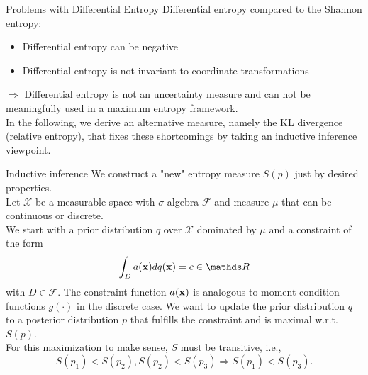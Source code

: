 \documentclass[11pt,compress,t,notes=noshow, xcolor=table]{beamer}
\begin{document}
    

\begin{vbframe} {Problems with Differential Entropy}
Differential entropy compared to the Shannon entropy:
\begin{itemize}
    \item Differential entropy can be negative
    \item Differential entropy is not invariant to coordinate transformations
\end{itemize}
$\Rightarrow$ Differential entropy is not an uncertainty measure and can not be meaningfully used in a maximum entropy framework. \\
\lz 
In the following, we derive an alternative measure, namely the KL divergence (relative entropy), that fixes these shortcomings by taking an inductive inference viewpoint.  
\end{vbframe}
\begin{vbframe}{Inductive inference}
    We construct a "new" entropy measure $S(p)$ just by desired properties.\\
    \lz
    Let $\mathcal{X}$ be a measurable space with $\sigma$-algebra $\mathcal{F}$ and measure $\mu$ that can be continuous or discrete. \\
    We start with a prior distribution $q$ over $\mathcal{X}$ dominated by $\mu$ and a constraint of the form $$\int_D a(\xv) dq(\xv) = c \in \R$$
    with $D \in \mathcal{F}.$ The constraint function $a(\mathbf{x})$ is analogous to moment condition functions $g(\cdot)$ in the discrete case.
    We want to update the prior distribution $q$ to a posterior distribution $p$ that fulfills the constraint and is maximal w.r.t. $S(p).$  \\
    For this maximization to make sense, $S$ must be transitive, i.e., 
    $$S(p_1) < S(p_2), S(p_2) < S(p_3) \Rightarrow S(p_1) < S(p_3).$$
\end{vbframe}
\end{document}
